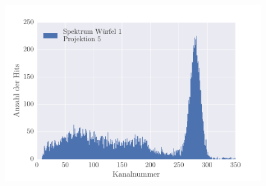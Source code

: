 \begin{figure}[!h]
 \centering
 \includegraphics[scale=1]{../Grafiken/Spektrum_Block_1_Messung_5_0_350_histogram.pdf}
 \caption{\label{fig:spektrum_block_1_messung_5_0_350_histogram}}
 \end{figure} 